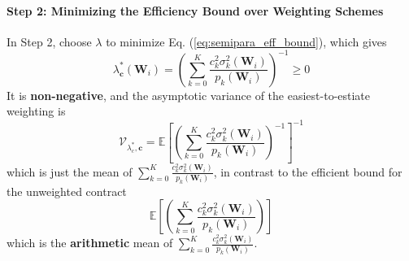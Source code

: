 \documentclass[twoside]{article}
\begin{document}
\paragraph*{Step 2: Minimizing the Efficiency Bound over Weighting Schemes}
In Step 2, choose $\lambda$ to minimize Eq. (\ref{eq:semipara_eff_bound}), which gives 
\begin{equation}\label{eq:optimal_weight}
    \lambda^*_{\mathbf{c}}\left(\mathbf{W}_i\right) = \left( \sum^K_{k=0} \frac{c_k^2 \sigma^2_k(\mathbf{W}_i)}{p_k(\mathbf{W}_i)} \right)^{-1} \geq 0
\end{equation}
It is \textbf{non-negative},
and the asymptotic variance of the easiest-to-estiate weighting is
\begin{equation*}
    \mathcal{V}_{\lambda_c^*,\mathbf{c}} = \mathbb{E} \left[ \left( \sum^K_{k=0} \frac{c_k^2\sigma^2_k (\mathbf{W}_i)}{p_k(\mathbf{W}_i)} \right)^{-1} \right]^{-1}
\end{equation*}
which is just the  mean of $\sum^K_{k=0} \frac{c_k^2\sigma^2_k (\mathbf{W}_i)}{p_k(\mathbf{W}_i)}$, in contrast to the efficient bound for the unweighted contract
$$
\mathbb{E} \left[ \left(\sum^K_{k=0} \frac{c_k^2\sigma^2_k (\mathbf{W}_i)}{p_k(\mathbf{W}_i)}\right) \right]
$$
which is the \textbf{arithmetic} mean of $\sum^K_{k=0} \frac{c_k^2\sigma^2_k (\mathbf{W}_i)}{p_k(\mathbf{W}_i)}$.
\end{document}
